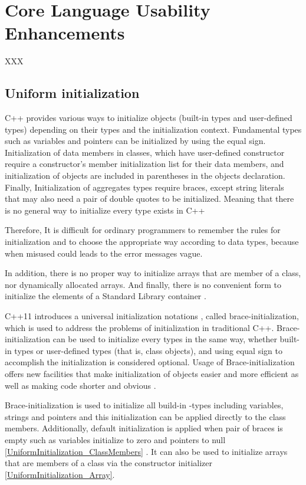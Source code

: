 \documentclass[11pt]{report}
\begin{document}
\chapter{Core Language Usability Enhancements}
\label{chapter: Usability Enhancements}
XXX

\section{Uniform initialization}
\label{section:Uniform initialization}
C++ provides various ways to initialize objects (built-in types and user-defined types) depending on their types and the initialization context. Fundamental types such as variables and pointers can be initialized by using the equal sign. Initialization of data members in classes, which have user-defined constructor require a constructor's member initialization list for their data members, and initialization of objects are included in parentheses in the objects declaration. Finally, Initialization of aggregates types require braces, except string literals that may also need a pair of double quotes to be initialized. Meaning that there is no general way to initialize every type exists in C++ \cite{Stroustrup:2012:Cpp11}


Therefore, It is difficult for ordinary programmers to remember the rules for initialization and to choose the appropriate way according to data types, because when misused could leads to the error messages vague.


In addition, there is no proper way to initialize arrays that are member of a class, nor dynamically allocated arrays. And finally, there is no convenient form to initialize the elements of a Standard Library container \cite{Stroustrup:2012:Cpp11}.


C++11 introduces a universal initialization notations { }, called brace-initialization, which is used to address the problems of initialization in traditional C++. Brace-initialization can be used to initialize every types in the same way, whether built-in types or user-defined types (that is, class objects), and using equal sign to accomplish the initialization is considered optional. Usage of Brace-initialization offers new facilities that make initialization of objects easier and more efficient as well as making code shorter and obvious \cite{Reddy:2011:API}.


Brace-initialization is used to initialize all build-in -types including variables, strings and pointers and this initialization can be applied directly to the class members. Additionally, default initialization is applied when pair of braces is empty such as variables initialize to zero and pointers to null \ref{UniformInitialization_ClassMembers} \cite{Reddy:2011:API}. It can also be used to initialize arrays that are members of a class via the constructor initializer \ref{UniformInitialization_Array}.
\end{document}

